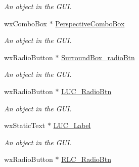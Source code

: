 \begin{DoxyCompactItemize}
\begin{DoxyCompactList}\small\item\em An object in the GUI. \item\end{DoxyCompactList}\item 
\hypertarget{classGUIFrame_a3eb1b47305a3643e6f34cba3fd3ed65b}{
wxComboBox $\ast$ \hyperlink{classGUIFrame_a3eb1b47305a3643e6f34cba3fd3ed65b}{PerspectiveComboBox}}
\label{classGUIFrame_a3eb1b47305a3643e6f34cba3fd3ed65b}

\begin{DoxyCompactList}\small\item\em An object in the GUI. \item\end{DoxyCompactList}\item 
\hypertarget{classGUIFrame_a31e4c4d5a520608056d5c6c940bd58bc}{
wxRadioButton $\ast$ \hyperlink{classGUIFrame_a31e4c4d5a520608056d5c6c940bd58bc}{SurroundBox\_\-radioBtn}}
\label{classGUIFrame_a31e4c4d5a520608056d5c6c940bd58bc}

\begin{DoxyCompactList}\small\item\em An object in the GUI. \item\end{DoxyCompactList}\item 
\hypertarget{classGUIFrame_a4959782eea9069c13a13881170d6c8fa}{
wxRadioButton $\ast$ \hyperlink{classGUIFrame_a4959782eea9069c13a13881170d6c8fa}{LUC\_\-RadioBtn}}
\label{classGUIFrame_a4959782eea9069c13a13881170d6c8fa}

\begin{DoxyCompactList}\small\item\em An object in the GUI. \item\end{DoxyCompactList}\item 
\hypertarget{classGUIFrame_a54c9a0216c4843d0660617c05f15632b}{
wxStaticText $\ast$ \hyperlink{classGUIFrame_a54c9a0216c4843d0660617c05f15632b}{LUC\_\-Label}}
\label{classGUIFrame_a54c9a0216c4843d0660617c05f15632b}

\begin{DoxyCompactList}\small\item\em An object in the GUI. \item\end{DoxyCompactList}\item 
\hypertarget{classGUIFrame_a32290a9504fa5d4e3070759d8fec35ed}{
wxRadioButton $\ast$ \hyperlink{classGUIFrame_a32290a9504fa5d4e3070759d8fec35ed}{RLC\_\-RadioBtn}}
\label{classGUIFrame_a32290a9504fa5d4e3070759d8fec35ed}


\end{DoxyCompactItemize}
